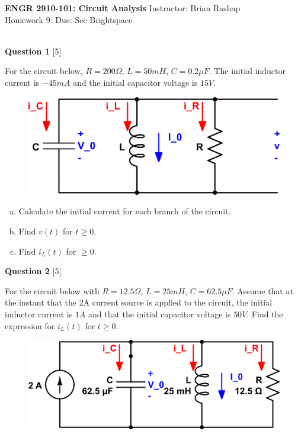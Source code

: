 \documentclass[12pt]{article}
\begin{document}
\begin{center}
\hfil
{\large\bf {ENGR 2910-101: Circuit Analysis}}
\hfill Instructor: Brian Rashap\\
Homework 9: \hfill Due: See Brightspace\\
\hrulefill\\
\end{center}

{\bf Question 1} [5] %

For the circuit below, $R = 200 \Omega$, $L = 50 mH$, $C=0.2\mu F$. The initial inductor current is $-45mA$ and the initial capacitor voltage is $15V$. 

\begin{figure}[h!]
\begin{center}
 \includegraphics[scale=0.4]{fig8_1.png}
\end{center}
\end{figure}

\begin{enumerate}[(a)]
\item Calculate the initial current for each branch of the circuit.
\item Find $v(t)$ for $t \geq 0$.
\item Find $i_L(t)$ for $ \geq 0$.
\end{enumerate}


\vspace{0.1in}


{\bf Question 2} [5] %

For the circuit below with $R = 12.5 \Omega$, $L = 25 mH$, $C=62.5\mu F$. Assume that at the instant that the 2A current source is applied to the circuit, the initial inductor current is $1A$ and that the initial capacitor voltage is $50 V$.
Find the expression for $i_L(t)$ for $t \geq 0$. 

\begin{figure}[h!]
\begin{center}
 \includegraphics[scale=0.6]{fig8_32.png}
\end{center}
\end{figure}
\end{document}
